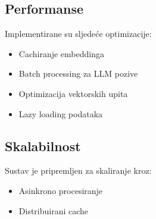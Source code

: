 \subsection{Performanse}
Implementirane su sljedeće optimizacije:
\begin{itemize}
    \item Cachiranje embeddinga
    \item Batch processing za LLM pozive
    \item Optimizacija vektorskih upita
    \item Lazy loading podataka
\end{itemize}

\subsection{Skalabilnost}
Sustav je pripremljen za skaliranje kroz:
\begin{itemize}
    \item Asinkrono procesiranje
    \item Distribuirani cache
\end{itemize} 